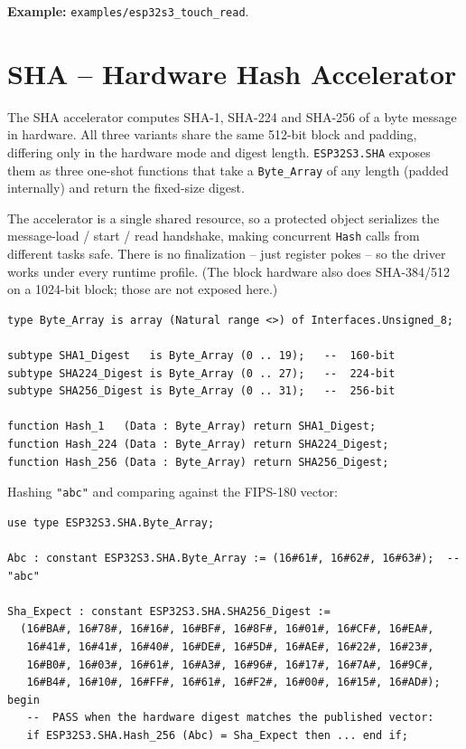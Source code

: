 \noindent\textbf{Example:} \texttt{examples/esp32s3\_touch\_read}.

\section{SHA -- Hardware Hash Accelerator}
\label{app:int:sha}

The SHA accelerator computes SHA-1, SHA-224 and SHA-256 of a byte message in
hardware. All three variants share the same 512-bit block and padding, differing
only in the hardware mode and digest length. \texttt{ESP32S3.SHA} exposes them as
three one-shot functions that take a \texttt{Byte\_Array} of any length (padded
internally) and return the fixed-size digest.

The accelerator is a single shared resource, so a protected object serializes the
message-load / start / read handshake, making concurrent \texttt{Hash} calls from
different tasks safe. There is no finalization -- just register pokes -- so the
driver works under every runtime profile. (The block hardware also does
SHA-384/512 on a 1024-bit block; those are not exposed here.)

\begin{lstlisting}
type Byte_Array is array (Natural range <>) of Interfaces.Unsigned_8;

subtype SHA1_Digest   is Byte_Array (0 .. 19);   --  160-bit
subtype SHA224_Digest is Byte_Array (0 .. 27);   --  224-bit
subtype SHA256_Digest is Byte_Array (0 .. 31);   --  256-bit

function Hash_1   (Data : Byte_Array) return SHA1_Digest;
function Hash_224 (Data : Byte_Array) return SHA224_Digest;
function Hash_256 (Data : Byte_Array) return SHA256_Digest;
\end{lstlisting}

Hashing \texttt{"abc"} and comparing against the FIPS-180 vector:

\begin{lstlisting}
use type ESP32S3.SHA.Byte_Array;

Abc : constant ESP32S3.SHA.Byte_Array := (16#61#, 16#62#, 16#63#);  --  "abc"

Sha_Expect : constant ESP32S3.SHA.SHA256_Digest :=
  (16#BA#, 16#78#, 16#16#, 16#BF#, 16#8F#, 16#01#, 16#CF#, 16#EA#,
   16#41#, 16#41#, 16#40#, 16#DE#, 16#5D#, 16#AE#, 16#22#, 16#23#,
   16#B0#, 16#03#, 16#61#, 16#A3#, 16#96#, 16#17#, 16#7A#, 16#9C#,
   16#B4#, 16#10#, 16#FF#, 16#61#, 16#F2#, 16#00#, 16#15#, 16#AD#);
begin
   --  PASS when the hardware digest matches the published vector:
   if ESP32S3.SHA.Hash_256 (Abc) = Sha_Expect then ... end if;
\end{lstlisting}

